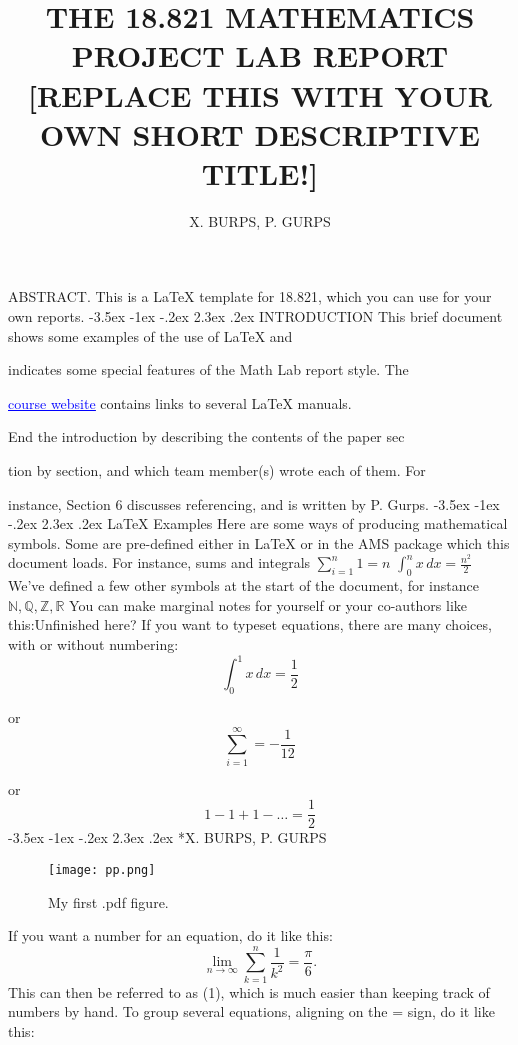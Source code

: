 \documentclass[leqno]{article}
\title{\textbf{THE 18.821 MATHEMATICS PROJECT LAB REPORT
		[REPLACE THIS WITH YOUR OWN SHORT
		DESCRIPTIVE TITLE!]}}
\author{X. BURPS, P. GURPS}
\date{}
\makeatletter
\renewcommand\section{\@startsection {section}{1}{\z@}%
	{-3.5ex \@plus -1ex \@minus -.2ex}%
	{2.3ex \@plus.2ex}%
	{\normalfont\Large}}
\makeatother
\begin{document}
    \maketitle
ABSTRACT. This is a \LaTeX{} template for 18.821, which you can
use for your own reports.
\vspace{1cm}
\centering
\section{INTRODUCTION}
This brief document shows some examples of the use of \LaTeX{} and\par{}
indicates some special features of the Math Lab report style. The\par{} 
\href{http://stellar.mit.edu/S/course/18/sp13/18.821/}{\textcolor{blue}{\underline{course website}}} contains links to several \LaTeX{} manuals.\par{}
End the introduction by describing the contents of the paper sec­ \par{}
tion by section, and which team member(s) wrote each of them. For \par{}
instance, Section 6 discusses referencing, and is written by P. Gurps.
\section{\LaTeX{} Examples}
Here are some ways of producing mathematical symbols. Some are
pre-deﬁned either in \LaTeX{} or in the AMS package which this document
loads. For instance, sums and integrals $\sum_{i=1}^{n} 1=n$ $\int_{0}^{n} x \, dx = \frac{n^2}{2}$ We’ve deﬁned a few other symbols at the start of the document, for
instance $\mathbb{N,Q,Z,R}$ You can make marginal notes for yourself or your
co-authors like this:Unﬁnished here?
If you want to typeset equations, there are many choices, with or
without numbering:
\newline
\[
\int_{0}^{1} x \,dx=\frac{1}{2}
\]
\raggedright
or
\[
\sum_{i=1}^{\infty}=- \frac{1}{12}
 \]
\raggedright
or 
\[
1-1+1-\ldots=\frac{1}{2}
\]
\newpage
\centering
\section*{X. BURPS, P. GURPS}

\begin{figure}[h]
	\centering
	\texttt{[image: pp.png]}
	\caption{My ﬁrst .pdf ﬁgure.}
	\label{fig:pp}
\end{figure}
If you want a number for an equation, do it like this:
\begin{equation}
\lim_{n \to \infty} \sum_{k=1}^{n} \frac{1}{k^2} =\frac{\pi}{6} .
\end{equation}
This can then be referred to as (1), which is much easier than keeping
track of numbers by hand. To group several equations, aligning on the
= sign, do it like this:
\end{document}
